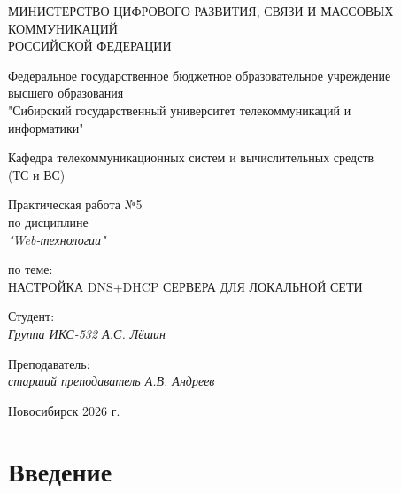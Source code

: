 \documentclass[a4paper,14pt,oneside,openany]{memoir}
\begin{document}
\thispagestyle{empty}

\begin{center}
    МИНИСТЕРСТВО ЦИФРОВОГО РАЗВИТИЯ, СВЯЗИ И МАССОВЫХ \\ КОММУНИКАЦИЙ \\ РОССИЙСКОЙ ФЕДЕРАЦИИ

    \vspace{20pt}

    Федеральное государственное бюджетное образовательное учреждение \\ высшего образования \\
    "Сибирский государственный университет телекоммуникаций и \\ информатики"

    \vspace{20pt}

    Кафедра телекоммуникационных систем и вычислительных средств \\ (ТС и ВС)
\end{center}

\vfill

\begin{center}
    Практическая работа №5 \\
    по дисциплине \\
    \textit{"Web-технологии"}

    \vspace{20pt}

    по теме: \\
    \uppercase{Настройка DNS+DHCP сервера для локальной сети}
\end{center}

\vfill

\noindent Студент: \\
\textit{Группа ИКС-532 \hfill А.С. Лёшин}

\vspace{20pt}

\noindent Преподаватель: \\
\textit{старший преподаватель \hfill А.В. Андреев}

\vfill

\begin{center}
    Новосибирск 2026 г.
\end{center}

\newpage
\setcounter{page}{2}
\OnehalfSpacing*

\section*{Введение}
\end{document}
